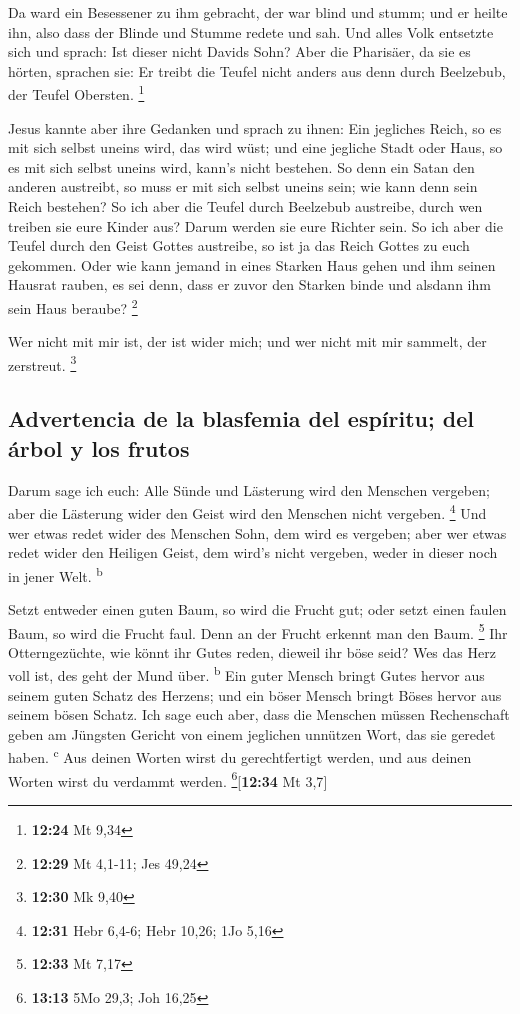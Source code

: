  Da ward ein Besessener zu ihm gebracht, der war blind
und stumm; und er heilte ihn, also dass der Blinde und Stumme redete und
sah.  Und alles Volk entsetzte sich und sprach: Ist
dieser nicht Davids Sohn?  Aber die Pharisäer, da sie es
hörten, sprachen sie: Er treibt die Teufel nicht anders aus denn durch
Beelzebub, der Teufel Obersten. \footnote{\textbf{12:24} Mt 9,34}

 Jesus kannte aber ihre Gedanken und sprach zu ihnen: Ein
jegliches Reich, so es mit sich selbst uneins wird, das wird wüst; und
eine jegliche Stadt oder Haus, so es mit sich selbst uneins wird, kann's
nicht bestehen.  So denn ein Satan den anderen austreibt,
so muss er mit sich selbst uneins sein; wie kann denn sein Reich
bestehen?  So ich aber die Teufel durch Beelzebub
austreibe, durch wen treiben sie eure Kinder aus? Darum werden sie eure
Richter sein.  So ich aber die Teufel durch den Geist
Gottes austreibe, so ist ja das Reich Gottes zu euch gekommen.
 Oder wie kann jemand in eines Starken Haus gehen und ihm
seinen Hausrat rauben, es sei denn, dass er zuvor den Starken binde und
alsdann ihm sein Haus beraube? \footnote{\textbf{12:29} Mt 4,1-11; Jes
  49,24}

 Wer nicht mit mir ist, der ist wider mich; und wer nicht
mit mir sammelt, der zerstreut. \footnote{\textbf{12:30} Mk 9,40}

\hypertarget{advertencia-de-la-blasfemia-del-espuxedritu-del-uxe1rbol-y-los-frutos}{%
\subsection{Advertencia de la blasfemia del espíritu; del árbol y los
frutos}\label{advertencia-de-la-blasfemia-del-espuxedritu-del-uxe1rbol-y-los-frutos}}

 Darum sage ich euch: Alle Sünde und Lästerung wird den
Menschen vergeben; aber die Lästerung wider den Geist wird den Menschen
nicht vergeben. \footnote{\textbf{12:31} Hebr 6,4-6; Hebr 10,26; 1Jo
  5,16}  Und wer etwas redet wider des Menschen Sohn, dem
wird es vergeben; aber wer etwas redet wider den Heiligen Geist, dem
wird's nicht vergeben, weder in dieser noch in jener Welt.
\textsuperscript{b}

 Setzt entweder einen guten Baum, so wird die Frucht gut;
oder setzt einen faulen Baum, so wird die Frucht faul. Denn an der
Frucht erkennt man den Baum. \footnote{\textbf{12:33} Mt 7,17}
 Ihr Otterngezüchte, wie könnt ihr Gutes reden, dieweil
ihr böse seid? Wes das Herz voll ist, des geht der Mund über.
\textsuperscript{b}  Ein guter Mensch bringt Gutes hervor
aus seinem guten Schatz des Herzens; und ein böser Mensch bringt Böses
hervor aus seinem bösen Schatz.  Ich sage euch aber, dass
die Menschen müssen Rechenschaft geben am Jüngsten Gericht von einem
jeglichen unnützen Wort, das sie geredet haben. \textsuperscript{c}
 Aus deinen Worten wirst du gerechtfertigt werden, und
aus deinen Worten wirst du verdammt werden. \footnote{\textbf{13:13} 5Mo
  29,3; Joh 16,25}{[}\textbf{12:34} Mt 3,7{]}

